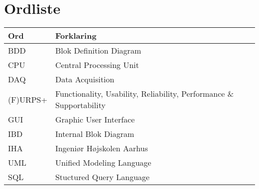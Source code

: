 \chapter{Ordliste}


\begin{longtabu} to 
    Ord &    Forklaring\\
    \toprule
    BDD & Blok Definition Diagram \\	
    CPU & Central Processing Unit\\    
    DAQ & Data Acquisition\\
    (F)URPS+ & Functionality, Usability, Reliability, Performance \& Supportability\\
	GUI & Graphic User Interface\\
	IBD & Internal Blok Diagram\\
	IHA & Ingeniør Højskolen Aarhus\\
	UML & Unified Modeling Language\\
	SQL & Stuctured Query Language\\
\end{longtabu}